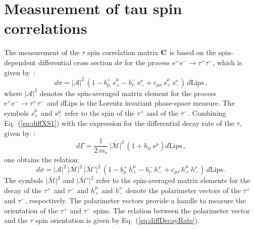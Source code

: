 \documentclass[a4paper,12pt,twocolumn]{article}
\numberwithin{equation}{section} %
\newcommand{\CC}{\operatorname{\bf C}}
\newcommand{\Pem}{\ensuremath{\textrm{e}^{-}}\xspace}
\newcommand{\Pep}{\ensuremath{\textrm{e}^{+}}\xspace}
\newcommand{\Pgt}{\ensuremath{\tau}\xspace}
\newcommand{\Pgtm}{\ensuremath{\tau^{-}}\xspace}
\newcommand{\Pgtp}{\ensuremath{\tau^{+}}\xspace}
\newcommand{\s}{\ensuremath{s}\xspace}
\newcommand{\h}{\ensuremath{h}\xspace}
\begin{document}
\section{Measurement of tau spin correlations}
\label{sec:AnalysisStrategy}

The measurement of the $\Pgt$ spin correlation matrix $\CC$ is based on the spin-dependent differential cross section $d\sigma$ for the process $\Pep\Pem \to \Pgtp\Pgtm$, which is given by~\cite{Jadach:1990mz}:
\begin{equation}
d\sigma = \vert\mathcal{A}\vert^{2} \, \left( 1 - b^{+}_{\mu} \, \s_{+}^{\mu} - b^{-}_{\nu} \, \s_{-}^{\nu} + c_{\mu\nu} \, \s_{+}^{\mu} \, \s_{-}^{\nu} \right) \, d\textrm{Lips} \, ,
\label{eq:diffXS1}
\end{equation}
where $\vert\mathcal{A}\vert^{2}$ denotes the spin-averaged matrix element for the process $\Pep\Pem \to \Pgtp\Pgtm$ and $d\textrm{Lips}$ is the Lorentz invariant phase-space measure.
The symbols $\s_{+}^{\mu}$ and $\s_{-}^{\mu}$ refer to the spin of the $\Pgtp$ and of the $\Pgtm$.
Combining Eq.~(\ref{eq:diffXS1}) with the expression for the differential decay rate of the $\Pgt$, given by~\cite{Jadach:1990mz}:
\begin{equation}
d\Gamma = \frac{1}{2 \, m_{\Pgt}} \, \vert\mathcal{\bar{M}}\vert^{2} \, \left( 1 + \h_{\mu} \, \s^{\mu} \right) d\textrm{Lips} \, ,
\label{eq:diffDecayRate}
\end{equation}
one obtains the relation:
\begin{equation}
d\sigma = \vert\mathcal{A}\vert^{2} \, \vert\mathcal{\bar{M}}\vert^{2} \, \vert\mathcal{\bar{M}'}\vert^{2} \, \left( 1 - b^{+}_{\mu} \, \h_{+}^{\mu} - b^{-}_{\nu} \, \h_{-}^{\nu} + c_{\mu\nu} \, \h_{+}^{\mu} \, \h_{-}^{\nu} \right) \, d\textrm{Lips} \, .
\label{eq:diffXS2}
\end{equation}
The symbols $\vert\mathcal{\bar{M}}\vert^{2}$ and $\vert\mathcal{\bar{M}'}\vert^{2}$ refer to the spin-averaged matrix elements for the decay of the $\Pgtp$ and $\Pgtm$ and $\h_{+}^{\mu}$ and $\h_{-}^{\nu}$ denote the polarimeter vectors of the $\Pgtp$ and $\Pgtm$, respectively.
The polarimeter vectors provide a handle to measure the orientation of the $\Pgtp$ and $\Pgtm$ spins.
The relation between the polarimeter vector and the $\Pgt$ spin orientation is given by Eq.~(\ref{eq:diffDecayRate}).
\end{document}
